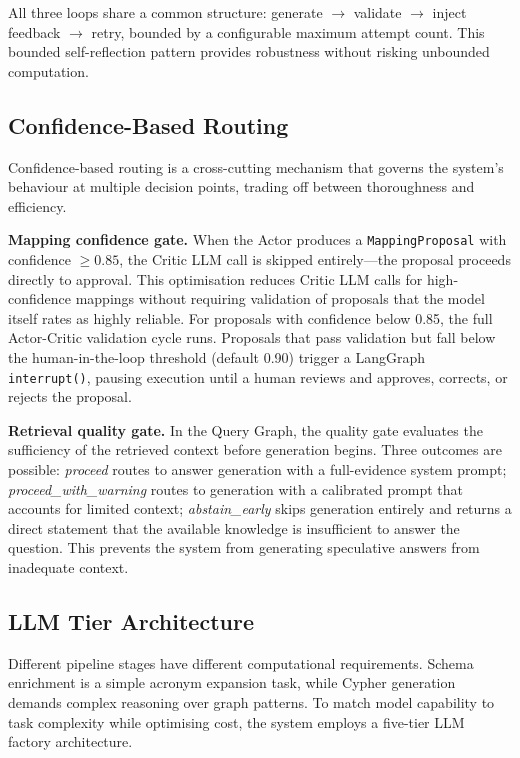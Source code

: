 All three loops share a common structure: generate $\rightarrow$ validate $\rightarrow$ inject feedback $\rightarrow$ retry, bounded by a configurable maximum attempt count. This bounded self-reflection pattern provides robustness without risking unbounded computation.

\subsection{Confidence-Based Routing}
\label{sec:sd:confidence}

Confidence-based routing is a cross-cutting mechanism that governs the system's behaviour at multiple decision points, trading off between thoroughness and efficiency.

\textbf{Mapping confidence gate.} When the Actor produces a \texttt{MappingProposal} with confidence $\geq 0.85$, the Critic LLM call is skipped entirely---the proposal proceeds directly to approval. This optimisation reduces Critic LLM calls for high-confidence mappings without requiring validation of proposals that the model itself rates as highly reliable. For proposals with confidence below 0.85, the full Actor-Critic validation cycle runs. Proposals that pass validation but fall below the human-in-the-loop threshold (default 0.90) trigger a LangGraph \texttt{interrupt()}, pausing execution until a human reviews and approves, corrects, or rejects the proposal.

\textbf{Retrieval quality gate.} In the Query Graph, the quality gate evaluates the sufficiency of the retrieved context before generation begins. Three outcomes are possible: \emph{proceed} routes to answer generation with a full-evidence system prompt; \emph{proceed\_with\_warning} routes to generation with a calibrated prompt that accounts for limited context; \emph{abstain\_early} skips generation entirely and returns a direct statement that the available knowledge is insufficient to answer the question. This prevents the system from generating speculative answers from inadequate context.

\subsection{LLM Tier Architecture}
\label{sec:sd:llm_tiers}

Different pipeline stages have different computational requirements. Schema enrichment is a simple acronym expansion task, while Cypher generation demands complex reasoning over graph patterns. To match model capability to task complexity while optimising cost, the system employs a five-tier LLM factory architecture.

